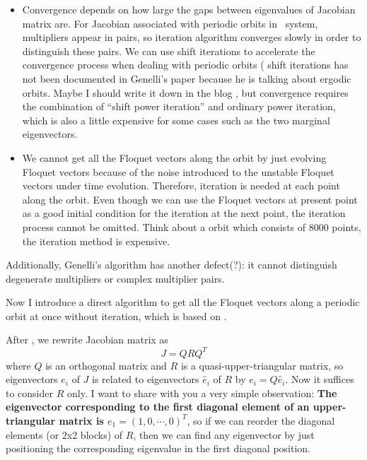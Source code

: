 \begin{itemize}
\item Convergence depends on how large the gaps between eigenvalues
  of Jacobian matrix are. For
  Jacobian associated with periodic orbits in \KS\ system, multipliers
  appear in pairs, so iteration algorithm converges slowly in order to
  distinguish these pairs. We can use shift iterations to accelerate
  the convergence process when dealing with periodic orbits
  ( shift iterations has not been documented
  in Genelli's paper because he is talking about ergodic orbits. Maybe I
  should write it down in the blog , but convergence requires
  the combination of ``shift power iteration'' and  ordinary power
  iteration, which is also a little expensive for some cases such
  as the two marginal eigenvectors.

\item We cannot get all the Floquet vectors along the orbit by
  just evolving
  Floquet vectors because of the noise introduced to the unstable
  Floquet vectors under time evolution. Therefore, iteration is
  needed at each point along
  the orbit. Even though we can use the Floquet vectors at present
  point as a good initial condition for the iteration at the next point,
  the iteration process cannot be omitted. Think about a orbit which
  consists of 8000 points, the iteration method is expensive.
\end{itemize}

Additionally, Genelli's algorithm has another defect(?): it cannot
distinguish degenerate multipliers or complex multiplier pairs.

Now I introduce a direct algorithm to get all the Floquet vectors
along a periodic orbit at once without iteration, which is based on
\psd .

After \psd , we rewrite Jacobian matrix as
\begin{equation}
  \label{eq:xdpsd}
  J=QRQ^{T}
\end{equation}
where $Q$
is an orthogonal matrix and $R$ is a quasi-upper-triangular matrix,
so eigenvectors $e_{i}$ of $J$ is related to eigenvectors $\hat{e}_{i}$
 of $R$ by $e_{i}=Q\hat{e}_{i}$.  Now it suffices to consider $R$
only. I want to share with you a very simple observation:
\textbf{The eigenvector corresponding to the first diagonal element
of an upper-triangular matrix is $e_{1}=(1,0,\cdots,0)^{T}$}, so
if we can reorder the diagonal elements (or 2x2 blocks) of $R$, then
we can find any eigenvector by just positioning the corresponding
eigenvalue in the first diagonal position.

